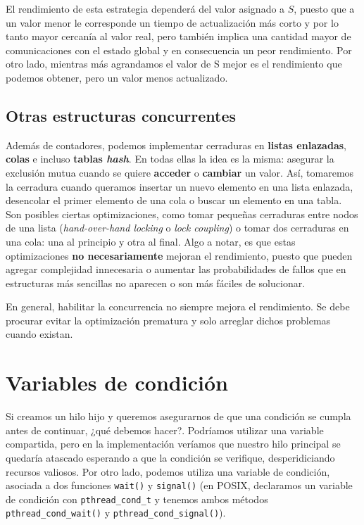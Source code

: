 \documentclass{article}
\begin{document}
	El rendimiento de esta estrategia dependerá del valor asignado a $S$, puesto que a un valor menor le corresponde un tiempo de actualización más corto y por lo tanto mayor cercanía al valor real, pero también implica una cantidad mayor de comunicaciones con el estado global y en consecuencia un peor rendimiento. Por otro lado, mientras más agrandamos el valor de S mejor es el rendimiento que podemos obtener, pero un valor menos actualizado.
	
	\subsection{Otras estructuras concurrentes}
	Además de contadores, podemos implementar cerraduras en \textbf{listas enlazadas}, \textbf{colas} e incluso \textbf{tablas \textit{hash}}. En todas ellas la idea es la misma: asegurar la exclusión mutua cuando se quiere \textbf{acceder} o \textbf{cambiar} un valor. Así, tomaremos la cerradura cuando queramos insertar un nuevo elemento en una lista enlazada, desencolar el primer elemento de una cola o buscar un elemento en una tabla. Son posibles ciertas optimizaciones, como tomar pequeñas cerraduras entre nodos de una lista (\textit{hand-over-hand locking} o \textit{lock coupling}) o tomar dos cerraduras en una cola: una al principio y otra al final. Algo a notar, es que estas optimizaciones \textbf{no necesariamente} mejoran el rendimiento, puesto que pueden agregar complejidad innecesaria o aumentar las probabilidades de fallos que en estructuras más sencillas no aparecen o son más fáciles de solucionar.
	
	En general, habilitar la concurrencia no siempre mejora el rendimiento. Se debe procurar evitar la optimización prematura y solo arreglar dichos problemas cuando existan.
	
	\section{Variables de condición}
	Si creamos un hilo hijo y queremos asegurarnos de que una condición se cumpla antes de continuar, ¿qué debemos hacer?. Podríamos utilizar una variable compartida, pero en la implementación veríamos que nuestro hilo principal se quedaría atascado esperando a que la condición se verifique, desperidiciando recursos valiosos. Por otro lado, podemos utiliza una variable de condición, asociada a dos funciones \lstinline|wait()| y \lstinline|signal()| (en POSIX, declaramos un variable de condición con \lstinline|pthread_cond_t| y tenemos ambos métodos \lstinline|pthread_cond_wait()| y \lstinline|pthread_cond_signal()|).
	
\end{document}
